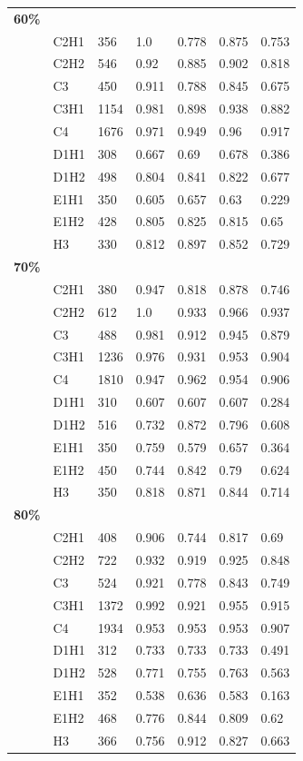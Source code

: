 \begin{table}
\begin{center}
\begin{tabular}{lllllll}
{\bfseries 60\%} & \\
& C2H1 &  356  &  1.0   &  0.778 &  0.875 &  0.753 \\
& C2H2 &  546  &  0.92  &  0.885 &  0.902 &  0.818 \\
& C3   &  450  &  0.911 &  0.788 &  0.845 &  0.675 \\
& C3H1 &  1154 &  0.981 &  0.898 &  0.938 &  0.882 \\
& C4   &  1676 &  0.971 &  0.949 &  0.96  &  0.917 \\
& D1H1 &  308  &  0.667 &  0.69  &  0.678 &  0.386 \\
& D1H2 &  498  &  0.804 &  0.841 &  0.822 &  0.677 \\
& E1H1 &  350  &  0.605 &  0.657 &  0.63  &  0.229 \\
& E1H2 &  428  &  0.805 &  0.825 &  0.815 &  0.65  \\
& H3   &  330  &  0.812 &  0.897 &  0.852 &  0.729 \\  \hline

{\bfseries 70\%} & \\
& C2H1 &  380  &  0.947 &  0.818 &  0.878 &  0.746 \\
& C2H2 &  612  &  1.0   &  0.933 &  0.966 &  0.937 \\
& C3   &  488  &  0.981 &  0.912 &  0.945 &  0.879 \\
& C3H1 &  1236 &  0.976 &  0.931 &  0.953 &  0.904 \\
& C4   &  1810 &  0.947 &  0.962 &  0.954 &  0.906 \\
& D1H1 &  310  &  0.607 &  0.607 &  0.607 &  0.284 \\
& D1H2 &  516  &  0.732 &  0.872 &  0.796 &  0.608 \\
& E1H1 &  350  &  0.759 &  0.579 &  0.657 &  0.364 \\
& E1H2 &  450  &  0.744 &  0.842 &  0.79  &  0.624 \\
& H3   &  350  &  0.818 &  0.871 &  0.844 &  0.714 \\  \hline

{\bfseries 80\%} & \\
& C2H1 &  408  &  0.906 &  0.744 &  0.817 &  0.69  \\
& C2H2 &  722  &  0.932 &  0.919 &  0.925 &  0.848 \\
& C3   &  524  &  0.921 &  0.778 &  0.843 &  0.749 \\
& C3H1 &  1372 &  0.992 &  0.921 &  0.955 &  0.915 \\
& C4   &  1934 &  0.953 &  0.953 &  0.953 &  0.907 \\
& D1H1 &  312  &  0.733 &  0.733 &  0.733 &  0.491 \\
& D1H2 &  528  &  0.771 &  0.755 &  0.763 &  0.563 \\
& E1H1 &  352  &  0.538 &  0.636 &  0.583 &  0.163 \\
& E1H2 &  468  &  0.776 &  0.844 &  0.809 &  0.62  \\
& H3   &  366  &  0.756 &  0.912 &  0.827 &  0.663  \\  \hline


\end{tabular}
\end{center}
\end{table}
